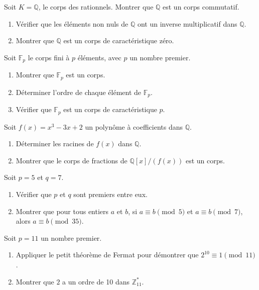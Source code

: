 \begin{exercice}
Soit \( K = \mathbb{Q} \), le corps des rationnels. Montrer que \( \mathbb{Q} \) est un corps commutatif.
\begin{enumerate}
    \item Vérifier que les éléments non nuls de \( \mathbb{Q} \) ont un inverse multiplicatif dans \( \mathbb{Q} \).
    \item Montrer que \( \mathbb{Q} \) est un corps de caractéristique zéro.
\end{enumerate}
\end{exercice}

\begin{exercice}
Soit \( \mathbb{F}_p \) le corps fini à \( p \) éléments, avec \( p \) un nombre premier.
\begin{enumerate}
    \item Montrer que \( \mathbb{F}_p \) est un corps.
    \item Déterminer l'ordre de chaque élément de \( \mathbb{F}_p \).
    \item Vérifier que \( \mathbb{F}_p \) est un corps de caractéristique \( p \).
\end{enumerate}
\end{exercice}

\begin{exercice}
Soit \( f(x) = x^3 - 3x + 2 \) un polynôme à coefficients dans \( \mathbb{Q} \).
\begin{enumerate}
    \item Déterminer les racines de \( f(x) \) dans \( \mathbb{Q} \).
    \item Montrer que le corps de fractions de \( \mathbb{Q}[x] / (f(x)) \) est un corps.
\end{enumerate}
\end{exercice}

\begin{exercice}
Soit \( p = 5 \) et \( q = 7 \).
\begin{enumerate}
    \item Vérifier que \( p \) et \( q \) sont premiers entre eux.
    \item Montrer que pour tous entiers \( a \) et \( b \), si \( a \equiv b \pmod{5} \) et \( a \equiv b \pmod{7} \), alors \( a \equiv b \pmod{35} \).
\end{enumerate}
\end{exercice}

\begin{exercice}
Soit \( p = 11 \) un nombre premier. 
\begin{enumerate}
    \item Appliquer le petit théorème de Fermat pour démontrer que \( 2^{10} \equiv 1 \pmod{11} \).
    \item Montrer que \( 2 \) a un ordre de 10 dans \( \mathbb{Z}_{11}^* \).
\end{enumerate}
\end{exercice}
